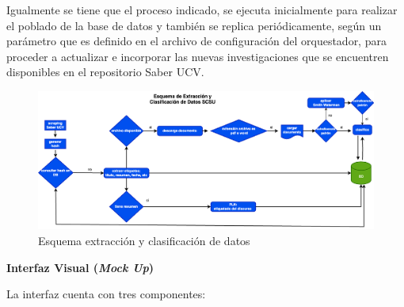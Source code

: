 \documentclass[
  12pt,
  openany]{book}
\begin{document}
Igualmente se tiene que el proceso indicado, se ejecuta inicialmente para realizar el poblado de la base de datos y también se replica periódicamente, según un parámetro que es definido en el archivo de configuración del orquestador, para proceder a actualizar e incorporar las nuevas investigaciones que se encuentren disponibles en el repositorio Saber UCV.

\begin{figure}

{\centering \includegraphics[width=0.9\linewidth]{images/05-desarrollo/4_ciclo/esquema extraccion} 

}

\caption{Esquema extracción y clasificación de datos}\label{fig:diagramaextra}
\end{figure}

\textbf{Interfaz Visual (\emph{Mock Up})}

La interfaz cuenta con tres componentes:
\end{document}
